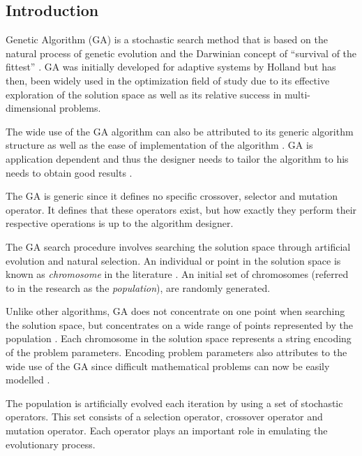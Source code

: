 \subsection{Introduction}
Genetic Algorithm (GA) is a stochastic search method that is based on the natural process of genetic evolution and the Darwinian concept of ``survival of the fittest'' \cite{DistributedHierarchicalGA,AcceleratingGA,AdaptiveSAGA,FamilyGA}. GA was initially developed for adaptive systems by Holland but has then, been widely used in the optimization field of study due to its effective exploration of the solution space as well as its relative success in multi-dimensional problems\cite{ParallelGASA,DistributedHierarchicalGA,FamilyGA}. 

The wide use of the GA algorithm can also be attributed to its generic algorithm structure as well as the ease of implementation of the algorithm \cite{FamilyGA,AdaptiveSAGA}. GA is application dependent and thus the designer needs to tailor the algorithm to his needs to obtain good results \cite{AcceleratingGA}.

The GA is generic since it defines no specific crossover, selector and mutation operator. It defines that these operators exist, but how exactly they perform their respective operations is up to the algorithm designer.

The GA search procedure involves searching the solution space through artificial evolution and natural selection\cite{FamilyGA,MultiPopGA,HybridIntelliGA}. An individual or point in the solution space is known as \emph{chromosome} in the literature \cite{HumanPassiveGA}. An initial set of chromosomes (referred to in the research as the \emph{population}), are randomly generated\cite{FamilyGA,HybridIntelliGA,AcceleratingGA,MultiPopGA}. 

Unlike other algorithms, GA does not concentrate on one point when searching the solution space, but concentrates on a wide range of points represented by the population \cite{DistributedHierarchicalGA,FamilyGA,HybridIntelliGA}\label{GASearchPoints}. Each chromosome in the solution space represents a string encoding of the problem parameters\cite{FamilyGA}. Encoding problem parameters also attributes to the wide use of the GA since difficult mathematical problems can now be easily modelled \cite{AcceleratingGA}.

The population is artificially evolved each iteration by using a set of stochastic operators\cite{SelfAdaptiveGA}. This set consists of a selection operator, crossover operator and mutation operator\cite{SelfAdaptiveGA,MultiPopGA}. Each operator plays an important role in emulating the evolutionary process. 

